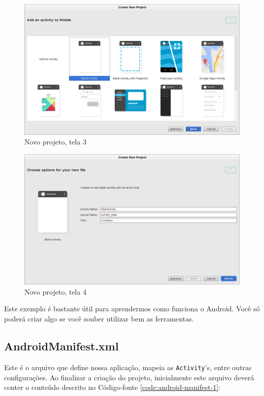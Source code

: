 \begin{figure}[p]
    \includegraphics[scale=0.35]{img/exemplo-pratico/android-new-project-3.png}
    \caption{Novo projeto, tela 3}
    \label{fig:new-project-3}
\end{figure}

\begin{figure}[h]
    \includegraphics[scale=0.32]{img/exemplo-pratico/android-new-project-4.png}
    \caption{Novo projeto, tela 4}
    \label{fig:new-project-4}
\end{figure}

Este exemplo é bastante útil para aprendermos como funciona o Android.
Você só poderá criar algo se você souber utilizar bem as ferramentas.

\subsection{AndroidManifest.xml}

Este é o arquivo que define nossa aplicação, mapeia as
\texttt{Activity}'s, entre outras configurações. Ao finalizar a criação
do projeto, inicialmente este arquivo deverá conter o conteúdo descrito
no Código-fonte \ref{code:android-manifest-1}:

